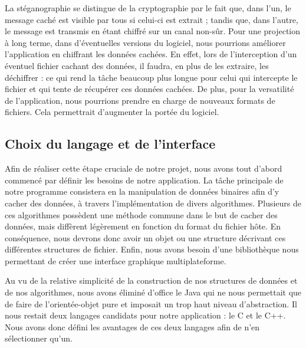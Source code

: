 \documentclass[11pt]{article}
\begin{document}
La stéganographie se distingue de la cryptographie par le fait que, dans l'un,
le message caché est visible par tous si celui-ci est extrait ; tandis que, dans
l'autre, le message est transmis en étant chiffré sur un canal non-sûr. \newline
Pour une projection à long terme, dans d'éventuelles versions du logiciel, nous
pourrions améliorer l'application en chiffrant les données cachées. En effet,
lors de l'interception d'un éventuel fichier cachant des données, il faudra, en
plus de les extraire, les déchiffrer : ce qui rend la tâche beaucoup plus longue
pour celui qui intercepte le fichier et qui tente de récupérer ces données
cachées. \newline
De plus, pour la versatilité de l'application, nous pourrions prendre en charge
de nouveaux formats de fichiers. Cela permettrait d'augmenter la portée du
logiciel. 

\subsection{Choix du langage et de l'interface} 
Afin de réaliser cette étape cruciale de notre projet, nous avons tout 
d’abord commencé par définir les besoins de notre application. La tâche 
principale de notre programme consistera en la manipulation de données 
binaires afin d’y cacher des données, à travers l’implémentation de divers 
algorithmes. Plusieurs de ces algorithmes possèdent une méthode commune dans
le but de cacher des données, mais diffèrent légèrement en fonction du 
format du fichier hôte. En conséquence, nous devrons donc avoir un objet
ou une structure décrivant ces différentes structures de fichier. Enfin, 
nous avons besoin d’une bibliothèque nous permettant de créer une interface 
graphique multiplateforme. 

Au vu de la relative simplicité de la construction de nos structures de 
données et de nos algorithmes, nous avons éliminé d’office le Java qui ne 
nous permettait que de faire de l’orientée-objet pure et imposait un trop 
haut niveau d’abstraction. Il nous restait deux langages candidats pour notre 
application : le C et le C++. Nous avons donc défini les avantages de ces 
deux langages afin de n'en sélectionner qu'un.
\end{document}
